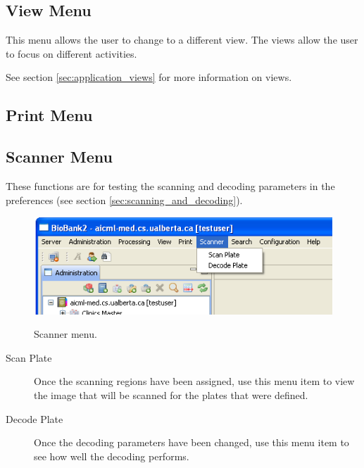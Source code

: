 \subsection{View Menu}
This menu allows the user to change to a different view. The views allow the
user to focus on different activities.

See section \ref{sec:application_views} for more information on views.


\subsection{Print Menu}

\subsection{Scanner Menu}
These functions are for testing the scanning and decoding parameters in the
preferences (see section \ref{sec:scanning_and_decoding}).
    \begin{figure}[H]
      \centering
      \scalebox{0.5}
      { \includegraphics*{screenshots/overview/main_menu_scanner} }
      \caption{Scanner menu.}
      \label{fig:main_menu_scanner}
    \end{figure}
\begin{description}
  \item[Scan Plate] Once the scanning regions have been assigned, use this menu
    item to view the image that will be scanned for the plates that were
    defined.
  \item[Decode Plate] Once the decoding parameters have been changed, use this
    menu item to see how well the decoding performs.
\end{description}

